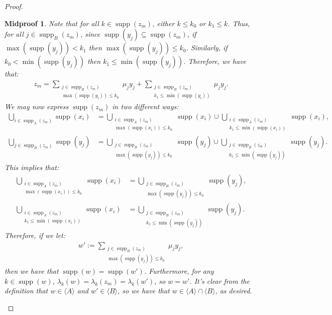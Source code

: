 \documentclass[10pt,a4paper]{amsart}
\newtheorem{midproof}{Midproof}
\renewcommand{\c}[1]{\langle #1 \rangle}
\newcommand{\func}{\operatorname}
\newcommand{\supp}{\func{supp}}
\begin{document}
\begin{proof}
\begin{midproof}
        Note that for all $k \in \supp(z_m)$, either $k \leq k_0$ or $k_1 \leq k$. Thus, for all $j \in \supp_B(z_m)$, since $\supp(y_j) \subseteq \supp(z_m)$, if $\max(\supp(y_j)) < k_1$ then $\max(\supp(y_j)) \leq k_0$. Similarly, if $k_0 < \min(\supp(y_j))$ then $k_1 \leq \min(\supp(y_j))$. Therefore, we have that:
        \begin{align*}
            z_m = \sum_{\substack{j \in \supp_B(z_m) \\ \max(\supp(y_i)) \leq k_0}} \mu_j y_j + \sum_{\substack{j \in \supp_B(z_m) \\ k_1 \leq \min(\supp(y_i))}} \mu_j y_j.
        \end{align*}
        We may now express $\supp(z_m)$ in two different ways:
        \begin{align*}
            \bigcup_{i \in \supp_A(z_m)} \supp(x_i) &= \bigcup_{\substack{i \in \supp_A(z_m) \\ \max(\supp(x_i)) \leq k_0}} \supp(x_i) \cup \bigcup_{\substack{i \in \supp_A(z_m) \\ k_1 \leq \min(\supp(x_i))}} \supp(x_i), \\
            \bigcup_{j \in \supp_B(z_m)} \supp(y_j) &= \bigcup_{\substack{j \in \supp_B(z_m) \\ \max(\supp(y_j)) \leq k_0}} \supp(y_j) \cup \bigcup_{\substack{j \in \supp_B(z_m) \\ k_1 \leq \min(\supp(y_j))}} \supp(y_j).
        \end{align*}
        This implies that:
        \begin{align*}
            \bigcup_{\substack{i \in \supp_A(z_m) \\ \max(\supp(x_i)) \leq k_0}} \supp(x_i) &= \bigcup_{\substack{j \in \supp_B(z_m) \\ \max(\supp(y_j)) \leq k_0}} \supp(y_j), \\
            \bigcup_{\substack{i \in \supp_A(z_m) \\ k_1 \leq \min(\supp(x_i))}} \supp(x_i) &= \bigcup_{\substack{j \in \supp_B(z_m) \\ k_1 \leq \min(\supp(y_j))}} \supp(y_j).
        \end{align*}
        Therefore, if we let:
        \begin{align*}
            w' := \sum_{\substack{j \in \supp_B(z_m) \\ \max(\supp(y_j)) \leq k_0}} \mu_jy_j,
        \end{align*}
        then we have that $\supp(w) = \supp(w')$. Furthermore, for any $k \in \supp(w)$, $\lambda_k(w) = \lambda_k(z_m) = \lambda_k(w')$, so $w = w'$. It's clear from the definition that $w \in \c{A}$ and $w' \in \c{B}$, so we have that $w \in \c{A} \cap \c{B}$, as desired.
    \end{midproof}


\end{proof}
\end{document}
